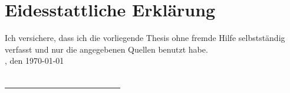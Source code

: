 \chapter{Eidesstattliche Erkl\"arung}
\label{ch:erklaerung}

Ich versichere, dass ich die vorliegende Thesis ohne fremde Hilfe selbstständig verfasst und nur die angegebenen Quellen benutzt habe.
\vspace*{2em}
\\
\myLocation, den \today \\\\

\underline{\ \ \ \ \ \ \ \ \ \ \ \ \ \ \ \ \ \ \ \ \ \ \ \ \ \ \ \ }\\\\
\small{\myName}

